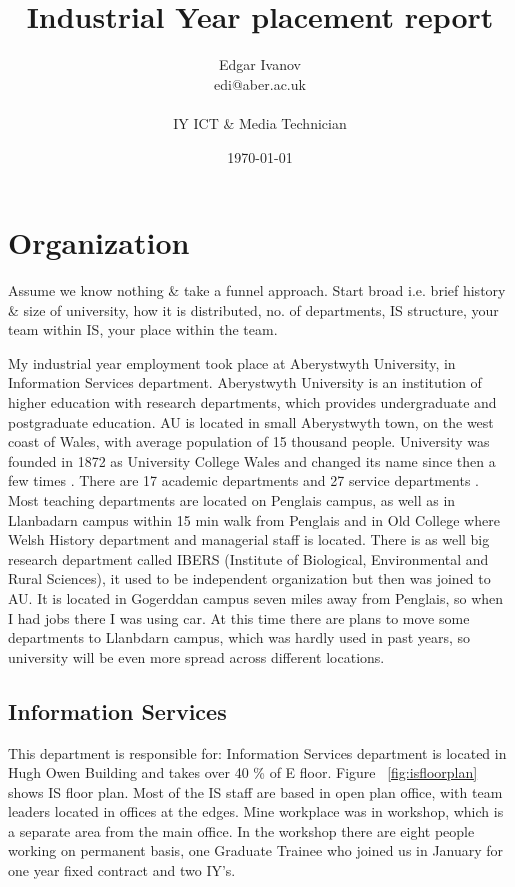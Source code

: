 \documentclass[10pt,a4paper,headinclude=true]{report}
\begin{document}
\onehalfspacing
\title{Industrial Year placement report}
\author{Edgar Ivanov\\ edi@aber.ac.uk \\ \\ IY ICT \& Media Technician}
\date{\today}

\maketitle
\tableofcontents

\chapter{\textbf{Organization}}
Assume we know nothing \& take a funnel approach. Start broad i.e. brief history \&
size of university, how it is distributed, no. of departments, IS structure, your
team within IS, your place within the team.

My industrial year employment took place at Aberystwyth University, in Information Services department. Aberystwyth University is an institution of higher education with research departments, which provides undergraduate and postgraduate education. AU is located in small Aberystwyth town, on the west coast of Wales, with average population of 15 thousand people. University was founded in 1872 as University College Wales and changed its name since then a few times \cite{History}.
There are 17 academic departments and 27 service departments \cite{Departments} \cite{Departments2}. Most teaching departments are located on Penglais campus, as well as in Llanbadarn campus within 15 min walk from Penglais and in Old College where Welsh History department and managerial staff is located. There is as well big research department called IBERS (Institute of Biological, Environmental and Rural Sciences), it used to be independent organization but then was joined to AU. It is located in Gogerddan campus seven miles away from Penglais, so when I had jobs there I was using car. At this time there are plans to move some departments to Llanbdarn campus, which was hardly used in past years, so university will be even more spread across different locations.

\section{Information Services}
This department is responsible for: 
Information Services department is located in Hugh Owen Building and takes over 40 \% of E floor. Figure ~\ref{fig:isfloorplan} shows IS floor plan. Most of the IS staff are based in open plan office, with team leaders located in offices at the edges. Mine workplace was in workshop, which is a separate area from the main office. In the workshop there are eight people working on permanent basis, one Graduate Trainee who joined us in January for one year fixed contract and two IY's.
\end{document}
